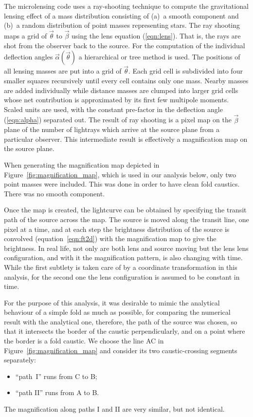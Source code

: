 \documentclass[usenatbib]{mn2e}
\begin{document}
The microlensing code uses a ray-shooting technique to compute the
gravitational lensing effect of a mass distribution consisting of
(a)~a smooth component and (b)~a random distribution of point masses
representing stars.  The ray shooting maps a grid of $\vec\theta$ to
$\vec\beta$ using the lens equation (\ref{eqn:lens}).  That is, the
rays are shot from the observer back to the source.  For the
computation of the individual deflection angles
$\vec\alpha(\vec\theta)$ a hierarchical or tree method is used.  The
positions of all lensing masses are put into a grid of $\vec\theta$.
Each grid cell is subdivided into four smaller squares recursively
until every cell contains only one mass.  Nearby masses are added
individually while distance masses are clumped into larger grid cells
whose net contribution is approximated by its first few multipole
moments.  Scaled units are used, with the constant pre-factor in the
deflection angle (\ref{eqn:alpha}) separated out.  The result of ray
shooting is a pixel map on the $\vec\beta$ plane of the number of
lightrays which arrive at the source plane from a particular observer.
This intermediate result is effectively a magnification map on the
source plane.

When generating the magnification map depicted in
Figure~\ref{fig:magnification_map}, which is used in our analysis
below, only two point masses were included.  This was done in order to
have clean fold caustics.  There was no smooth component.

Once the map is created, the lightcurve can be obtained by specifying
the transit path of the source across the map.  The source is moved
along the transit line, one pixel at a time, and at each step the
brightness distribution of the source is convolved
(equation~\ref{eqn:ft2d}) with the magnification map to give the
brightness.  In real life, not only are both lens and source moving
but the lens lens configuration, and with it the magnification
pattern, is also changing with time.  While the first subtlety is
taken care of by a coordinate transformation in this analysis, for the
second one the lens configuration is assumed to be constant in time.

For the purpose of this analysis, it was desirable to mimic the
analytical behaviour of a simple fold as much as possible, for
comparing the numerical result with the analytical one, therefore, the
path of the source was chosen, so that it intersects the border of the
caustic perpendicularly, and on a point where the border is a fold
caustic.  We choose the line AC in Figure~\ref{fig:magnification_map}
and consider its two caustic-crossing segments separately:
\begin{itemize}
\item ``path~I'' runs from C to B;
\item ``path II'' runs from A to B.
\end{itemize}
The magnification along paths I and II are very similar, but not
identical.
\end{document}
